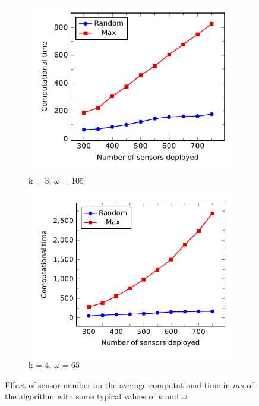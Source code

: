 %
\begin{figure}[h]
	\begin{subfigure}{.5\textwidth}
		\centering
		\includegraphics[scale=.8]{Hinhanh/SensorNumberEffect/time/k3omega105.pdf}
		\caption{k = 3, $\omega$ = 105}
	\end{subfigure}
	\begin{subfigure}{.5\textwidth}
		\centering
		\includegraphics[scale=.8]{Hinhanh/SensorNumberEffect/time/k4omega65.pdf}
		\caption{k = 4, $\omega$ = 65}
	\end{subfigure}
\caption{Effect of sensor number on the average computational time in $ms$ of the algorithm with some typical values of $k$ and $\omega$}
\label{fig:}
\end{figure}
